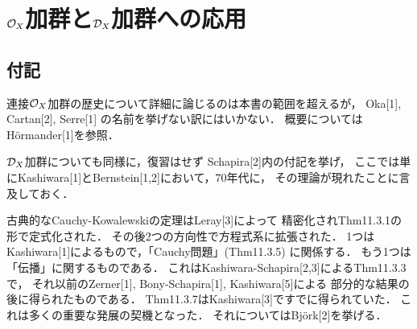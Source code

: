 


\setcounter{chapter}{10}

\chapter{\(\mathcal{O}_X\)加群と\(\mathcal{D}_X\)加群への応用}

\section*{付記}
連接\(\mathcal{O}_X\)加群の歴史について詳細に論じるのは本書の範囲を超えるが，
Oka[1], Cartan[2], Serre[1] の名前を挙げない訳にはいかない．
概要についてはH\"ormander[1]を参照．

\(\mathcal{D}_X\)加群についても同様に，復習はせず Schapira[2]内の付記を挙げ，
ここでは単にKashiwara[1]とBernstein[1,2]において，70年代に，
その理論が現れたことに言及しておく．

古典的なCauchy-Kowalewskiの定理はLeray[3]によって
精密化されThm11.3.1の形で定式化された．
その後2つの方向性で方程式系に拡張された．
1つはKashiwara[1]によるもので，「Cauchy問題」(Thm11.3.5) に関係する．
もう1つは「伝播」に関するものである．
これはKashiwara-Schapira[2,3]によるThm11.3.3で，
それ以前のZerner[1], Bony-Schapira[1], Kashiwara[5]による
部分的な結果の後に得られたものである．
Thm11.3.7はKashiwara[3]ですでに得られていた．
これは多くの重要な発展の契機となった．
それについてはBj\"ork[2]を挙げる．


































